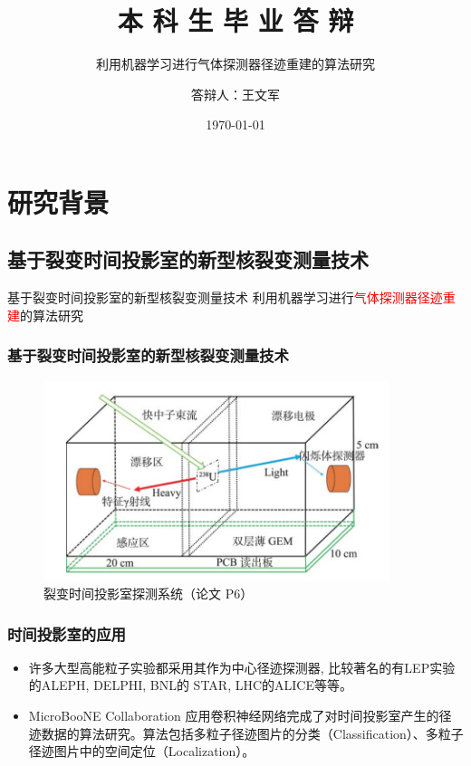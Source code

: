 \documentclass[14pt, AutoFakeBold]{ldr}
\title{本 科 生 毕 业 答 辩}
\subtitle{利用机器学习进行气体探测器径迹重建的算法研究}
\author{答辩人：王文军}
\institute{指导老师：张毅}
\date{\today}
\begin{document}
\maketitle






\section{研究背景}
\subsection{基于裂变时间投影室的新型核裂变测量技术}
\begin{frame}[c]{基于裂变时间投影室的新型核裂变测量技术}
利用机器学习进行\textcolor{red}{气体探测器径迹重建}的算法研究


  \frametitle{基于裂变时间投影室的新型核裂变测量技术}
  \begin{figure}[H]
  \centering
  \includegraphics[width=0.9\textwidth]{../figures/GEM-TPC.png}

  \caption{裂变时间投影室探测系统（论文 P6）}
  \label{fig-GEM-TPC}
  \end{figure}
  
\end{frame}



\begin{frame}
  \frametitle{时间投影室的应用}
  \begin{itemize}
    \item 许多大型高能粒子实验都采用其作为中心径迹探测器, 比较著名的有LEP实验的ALEPH, DELPHI, BNL的 STAR, LHC的ALICE等等。
    \item MicroBooNE Collaboration 应用卷积神经网络完成了对时间投影室产生的径迹数据的算法研究。算法包括多粒子径迹图片的分类（Classification）、多粒子径迹图片中的空间定位（Localization）。
    \end{itemize}
\end{frame}
\end{document}
